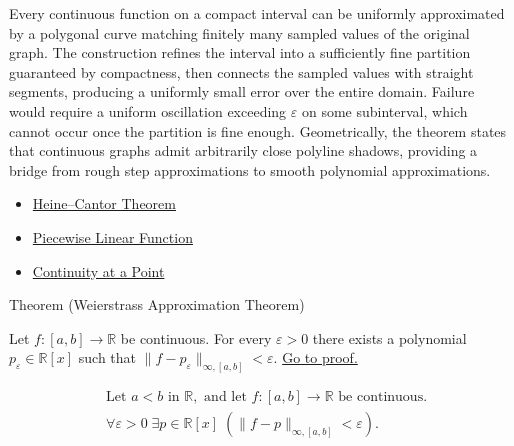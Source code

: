 \begin{remark*}[Interpretation]
Every continuous function on a compact interval can be uniformly approximated by a polygonal curve matching finitely many sampled values of the original graph. The construction refines the interval into a sufficiently fine partition guaranteed by compactness, then connects the sampled values with straight segments, producing a uniformly small error over the entire domain. Failure would require a uniform oscillation exceeding $\varepsilon$ on some subinterval, which cannot occur once the partition is fine enough. Geometrically, the theorem states that continuous graphs admit arbitrarily close polyline shadows, providing a bridge from rough step approximations to smooth polynomial approximations.
\end{remark*}

\begin{dependencies}
\begin{itemize}
  \item \hyperref[thm:heine-cantor]{Heine--Cantor Theorem}
  \item \hyperref[def:piecewise-linear-function]{Piecewise Linear Function}
  \item \hyperref[def:continuous-at-point]{Continuity at a Point}
\end{itemize}
\end{dependencies}

\begin{theorembox}{Theorem (Weierstrass Approximation Theorem)}
\begin{theorem}
\label{thm:weierstrass-approximation}
Let $f:[a,b]\to\mathbb{R}$ be continuous. For every $\varepsilon>0$ there exists a polynomial $p_\varepsilon\in\mathbb{R}[x]$ such that $\|f-p_\varepsilon\|_{\infty,[a,b]}<\varepsilon$.
\hyperref[prf:weierstrass-approximation]{Go to proof.}
\end{theorem}
\end{theorembox}

\begin{remark*}
\[
\begin{aligned}
&\text{Let } a<b \text{ in } \mathbb{R}, \text{ and let } f:[a,b]\to\mathbb{R} \text{ be continuous}.\\
&\forall \varepsilon>0\;\exists p\in\mathbb{R}[x]\;(\|f-p\|_{\infty,[a,b]}<\varepsilon).
\end{aligned}
\]
\end{remark*}

